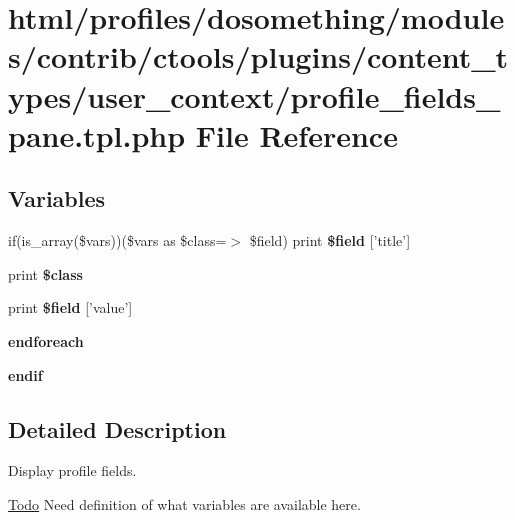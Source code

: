 \hypertarget{profile__fields__pane_8tpl_8php}{
\section{html/profiles/dosomething/modules/contrib/ctools/plugins/content\_\-types/user\_\-context/profile\_\-fields\_\-pane.tpl.php File Reference}
\label{profile__fields__pane_8tpl_8php}
}
\subsection*{Variables}
\begin{DoxyCompactItemize}
\item 
\hypertarget{profile__fields__pane_8tpl_8php_a5e66847a512328bcc5a9632ca75d3550}{
if(is\_\-array(\$vars))(\$vars as \$class=$>$ \$field) print {\bfseries \$field} \mbox{[}'title'\mbox{]}}
\label{profile__fields__pane_8tpl_8php_a5e66847a512328bcc5a9632ca75d3550}

\item 
\hypertarget{profile__fields__pane_8tpl_8php_a37ff9172f25a6ba53d6e3509c4934849}{
print {\bfseries \$class}}
\label{profile__fields__pane_8tpl_8php_a37ff9172f25a6ba53d6e3509c4934849}

\item 
\hypertarget{profile__fields__pane_8tpl_8php_a2ff201e8a0185ef0145c510b57ead182}{
print {\bfseries \$field} \mbox{[}'value'\mbox{]}}
\label{profile__fields__pane_8tpl_8php_a2ff201e8a0185ef0145c510b57ead182}

\item 
\hypertarget{profile__fields__pane_8tpl_8php_a672d9707ef91db026c210f98cc601123}{
{\bfseries endforeach}}
\label{profile__fields__pane_8tpl_8php_a672d9707ef91db026c210f98cc601123}

\item 
\hypertarget{profile__fields__pane_8tpl_8php_a82cd33ca97ff99f2fcc5e9c81d65251b}{
{\bfseries endif}}
\label{profile__fields__pane_8tpl_8php_a82cd33ca97ff99f2fcc5e9c81d65251b}

\end{DoxyCompactItemize}


\subsection{Detailed Description}
Display profile fields.

\begin{Desc}
\item[\hyperlink{todo__todo000044}{Todo}]Need definition of what variables are available here. \end{Desc}
